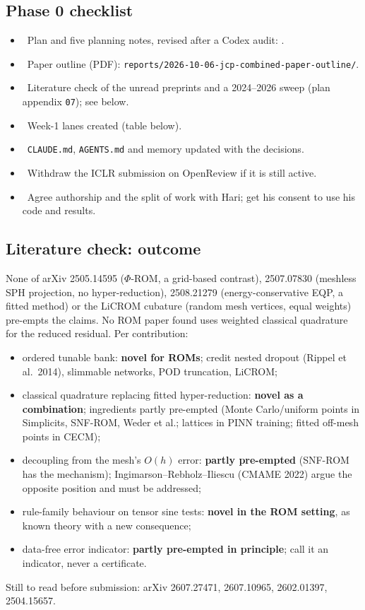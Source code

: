 \subsection*{Phase 0 checklist}
\begin{itemize}
\item \done\ Plan and five planning notes, revised after a Codex audit: .
\item \done\ Paper outline (PDF): \texttt{reports/2026-10-06-jcp-combined-paper-outline/}.
\item \done\ Literature check of the unread preprints and a 2024--2026 sweep (plan appendix \texttt{07}); see below.
\item \done\ Week-1 lanes created (table below).
\item \done\ \texttt{CLAUDE.md}, \texttt{AGENTS.md} and memory updated with the decisions.
\item \you\ Withdraw the ICLR submission on OpenReview if it is still active.
\item \you\ Agree authorship and the split of work with Hari; get his consent to use his code and results.
\end{itemize}

\subsection*{Literature check: outcome}
None of arXiv 2505.14595 ($\Phi$-ROM, a grid-based contrast), 2507.07830 (meshless SPH projection, no hyper-reduction), 2508.21279 (energy-conservative EQP, a fitted method) or the LiCROM cubature (random mesh vertices, equal weights) pre-empts the claims.
No ROM paper found uses weighted classical quadrature for the reduced residual.
Per contribution:
\begin{itemize}
\item ordered tunable bank: \textbf{novel for ROMs}; credit nested dropout (Rippel et al.~2014), slimmable networks, POD truncation, LiCROM;
\item classical quadrature replacing fitted hyper-reduction: \textbf{novel as a combination}; ingredients partly pre-empted (Monte Carlo/uniform points in Simplicits, SNF-ROM, Weder et al.; lattices in PINN training; fitted off-mesh points in CECM);
\item decoupling from the mesh's $O(h)$ error: \textbf{partly pre-empted} (SNF-ROM has the mechanism); Ingimarson--Rebholz--Iliescu (CMAME 2022) argue the opposite position and must be addressed;
\item rule-family behaviour on tensor sine tests: \textbf{novel in the ROM setting}, as known theory with a new consequence;
\item data-free error indicator: \textbf{partly pre-empted in principle}; call it an indicator, never a certificate.
\end{itemize}
Still to read before submission: arXiv 2607.27471, 2607.10965, 2602.01397, 2504.15657.

